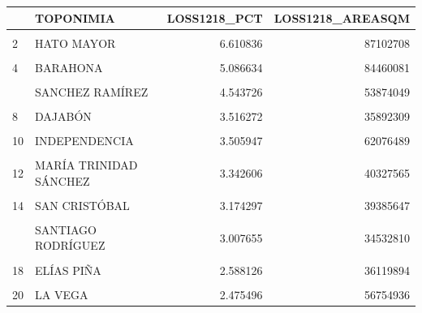 \documentclass[10pt,landscape,a3paper]{article}
\begin{document}
\begin{table}[H]
\centering
\begin{tabular}[t]{llrr}
\toprule
  & TOPONIMIA & LOSS1218\_PCT & LOSS1218\_AREASQM\\
\midrule
\cellcolor{lightgray}{1} & \cellcolor{lightgray}{SAMANÁ} & \cellcolor{lightgray}{7.092585} & \cellcolor{lightgray}{61201256}\\
2 & HATO MAYOR & 6.610836 & 87102708\\
\cellcolor{lightgray}{3} & \cellcolor{lightgray}{MONTE PLATA} & \cellcolor{lightgray}{6.026899} & \cellcolor{lightgray}{156843601}\\
4 & BARAHONA & 5.086634 & 84460081\\
\cellcolor{lightgray}{5} & \cellcolor{lightgray}{PEDERNALES} & \cellcolor{lightgray}{4.685672} & \cellcolor{lightgray}{97464819}\\
\addlinespace
6 & SANCHEZ RAMÍREZ & 4.543726 & 53874049\\
\cellcolor{lightgray}{7} & \cellcolor{lightgray}{MONSEÑOR NOUEL} & \cellcolor{lightgray}{4.053136} & \cellcolor{lightgray}{40206403}\\
8 & DAJABÓN & 3.516272 & 35892309\\
\cellcolor{lightgray}{9} & \cellcolor{lightgray}{PUERTO PLATA} & \cellcolor{lightgray}{3.508532} & \cellcolor{lightgray}{63368918}\\
10 & INDEPENDENCIA & 3.505947 & 62076489\\
\addlinespace
\cellcolor{lightgray}{11} & \cellcolor{lightgray}{LA ALTAGRACIA} & \cellcolor{lightgray}{3.432450} & \cellcolor{lightgray}{102838057}\\
12 & MARÍA TRINIDAD SÁNCHEZ & 3.342606 & 40327565\\
\cellcolor{lightgray}{13} & \cellcolor{lightgray}{ESPAILLAT} & \cellcolor{lightgray}{3.308128} & \cellcolor{lightgray}{27851494}\\
14 & SAN CRISTÓBAL & 3.174297 & 39385647\\
\cellcolor{lightgray}{15} & \cellcolor{lightgray}{VALVERDE} & \cellcolor{lightgray}{3.067846} & \cellcolor{lightgray}{25239085}\\
\addlinespace
16 & SANTIAGO RODRÍGUEZ & 3.007655 & 34532810\\
\cellcolor{lightgray}{17} & \cellcolor{lightgray}{MONTE CRISTI} & \cellcolor{lightgray}{2.931488} & \cellcolor{lightgray}{55185337}\\
18 & ELÍAS PIÑA & 2.588126 & 36119894\\
\cellcolor{lightgray}{19} & \cellcolor{lightgray}{SANTO DOMINGO} & \cellcolor{lightgray}{2.564897} & \cellcolor{lightgray}{33380362}\\
20 & LA VEGA & 2.475496 & 56754936\\
\bottomrule
\end{tabular}
\end{table}
\end{document}
